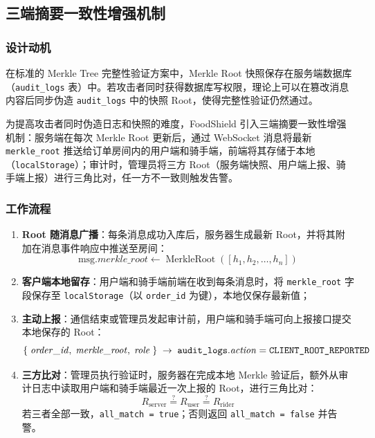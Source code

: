 \subsection{三端摘要一致性增强机制}
\label{subsec:triroot}

\subsubsection*{设计动机}

在标准的 Merkle Tree 完整性验证方案中，Merkle Root 快照保存在服务端数据库（\texttt{audit\_logs} 表）中。若攻击者同时获得数据库写权限，理论上可以在篡改消息内容后同步伪造 \texttt{audit\_logs} 中的快照 Root，使得完整性验证仍然通过。

为提高攻击者同时伪造日志和快照的难度，FoodShield 引入三端摘要一致性增强机制：服务端在每次 Merkle Root 更新后，通过 WebSocket 消息将最新 \texttt{merkle\_root} 推送给订单房间内的用户端和骑手端，前端将其存储于本地（\texttt{localStorage}）；审计时，管理员将三方 Root（服务端快照、用户端上报、骑手端上报）进行三角比对，任一方不一致则触发告警。

\subsubsection*{工作流程}

\begin{enumerate}[label=\arabic*., leftmargin=2em]
  \item \textbf{Root 随消息广播}：每条消息成功入库后，服务器生成最新 Root，并将其附加在消息事件响应中推送至房间：
    \[
      \mathrm{msg}.\mathit{merkle\_root} \gets \operatorname{MerkleRoot}([h_1, h_2, \ldots, h_n])
    \]
  \item \textbf{客户端本地留存}：用户端和骑手端前端在收到每条消息时，将 \texttt{merkle\_root} 字段保存至 \texttt{localStorage}（以 \texttt{order\_id} 为键），本地仅保存最新值；
  \item \textbf{主动上报}：通信结束或管理员发起审计前，用户端和骑手端可向上报接口提交本地保存的 Root：
    \[
      \{\;\mathit{order\_id},\;\mathit{merkle\_root},\;\mathit{role}\;\} \;\to\; \text{\texttt{audit\_logs}}.\mathit{action} = \text{\texttt{CLIENT\_ROOT\_REPORTED}}
    \]
  \item \textbf{三方比对}：管理员执行验证时，服务器在完成本地 Merkle 验证后，额外从审计日志中读取用户端和骑手端最近一次上报的 Root，进行三角比对：
    \[
      R_{\mathrm{server}} \stackrel{?}{=} R_{\mathrm{user}} \stackrel{?}{=} R_{\mathrm{rider}}
    \]
    若三者全部一致，\texttt{all\_match = true}；否则返回 \texttt{all\_match = false} 并告警。
\end{enumerate}

